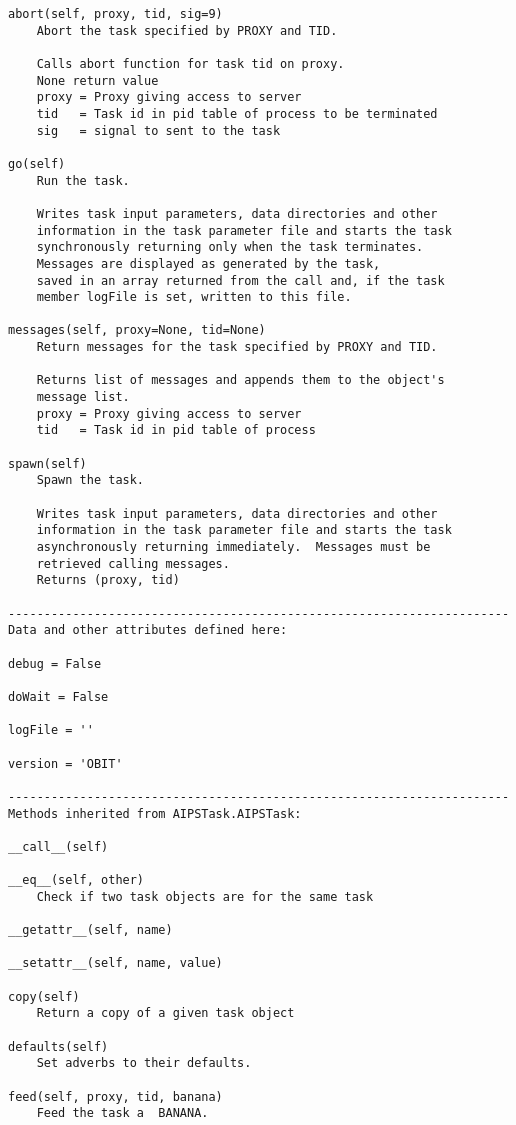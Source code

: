 \documentclass[11pt]{report}
\begin{document}
\begin{verbatim}
abort(self, proxy, tid, sig=9)
    Abort the task specified by PROXY and TID.
    
    Calls abort function for task tid on proxy.
    None return value
    proxy = Proxy giving access to server
    tid   = Task id in pid table of process to be terminated
    sig   = signal to sent to the task

go(self)
    Run the task.
    
    Writes task input parameters, data directories and other
    information in the task parameter file and starts the task
    synchronously returning only when the task terminates.
    Messages are displayed as generated by the task,
    saved in an array returned from the call and, if the task
    member logFile is set, written to this file.

messages(self, proxy=None, tid=None)
    Return messages for the task specified by PROXY and TID.
    
    Returns list of messages and appends them to the object's
    message list.
    proxy = Proxy giving access to server
    tid   = Task id in pid table of process

spawn(self)
    Spawn the task.
    
    Writes task input parameters, data directories and other
    information in the task parameter file and starts the task
    asynchronously returning immediately.  Messages must be
    retrieved calling messages.
    Returns (proxy, tid)

----------------------------------------------------------------------
Data and other attributes defined here:

debug = False

doWait = False

logFile = ''

version = 'OBIT'

----------------------------------------------------------------------
Methods inherited from AIPSTask.AIPSTask:

__call__(self)

__eq__(self, other)
    Check if two task objects are for the same task

__getattr__(self, name)

__setattr__(self, name, value)

copy(self)
    Return a copy of a given task object

defaults(self)
    Set adverbs to their defaults.

feed(self, proxy, tid, banana)
    Feed the task a  BANANA.
    

\end{verbatim}
\end{document}
